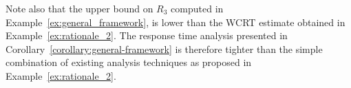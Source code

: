 Note also that the upper bound on $R_3$ computed in
Example~\ref{ex:general_framework}, is lower than the WCRT estimate obtained in Example~\ref{ex:rationale_2}. The response time analysis presented in Corollary~\ref{corollary:general-framework} is therefore tighter than the simple combination of existing analysis techniques as proposed in Example~\ref{ex:rationale_2}.






